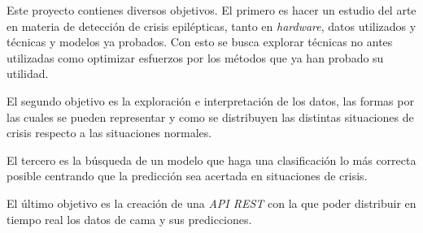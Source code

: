 
Este proyecto contienes diversos objetivos. El primero es hacer un estudio del arte en materia de detección de crisis epilépticas, tanto en \textit{hardware}, datos utilizados y técnicas y modelos ya probados. Con esto se busca explorar técnicas no antes utilizadas como optimizar esfuerzos por los métodos que ya han probado su utilidad.

El segundo objetivo es la exploración e interpretación de los datos, las formas por las cuales se pueden representar y como se distribuyen las distintas situaciones de crisis respecto a las situaciones normales. 

El tercero es la búsqueda de un modelo que haga una clasificación lo más correcta posible centrando que la predicción sea acertada en situaciones de crisis.

El último objetivo es la creación de una \textit{API REST} con la que poder distribuir en tiempo real los datos de cama y sus predicciones.
